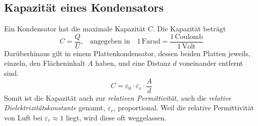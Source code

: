 \documentclass{article}
\begin{document}
\subsection{Kapazität eines Kondensators}
Ein Kondensator hat die maximale Kapazität $C$. Die Kapazität beträgt
\[
 C = \frac{Q}{U} \text{,}
 \quad \text{angegeben in} \quad
 1 \,\text{Farad} = \frac{1 \,\text{Coulomb}}{1 \,\text{Volt}} 
\]
Darüberhinaus gilt in einem Plattenkondensator, dessen beiden Platten jeweils, einzeln, den Flächeninhalt $A$ haben, und eine Distanz $d$ voneinander entfernt sind.
\[
 C = \varepsilon_0 \cdot \varepsilon_r \cdot \frac{A}{d} 
\]
Somit ist die Kapazität auch zur \emph{relativen Permittivität}, auch die \emph{relative Dielektrizitätskonstante} genannt, $\varepsilon_r$, proportional. Weil die relative Permittivität von Luft bei $\varepsilon_r \approx 1$ liegt, wird diese oft weggelassen.
\end{document}
